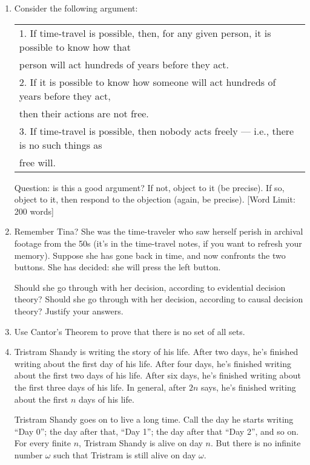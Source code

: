 \documentclass[12pt,a4paper]{article}
\begin{document}
\begin{enumerate}

\item Consider the following argument:
\begin{center}
\begin{tabular}{l}
1. If time-travel is possible, then, for any given person, it is possible to know how that\\ person will act hundreds of years before they act.\\
2. If it is possible to know how someone will act hundreds of years before they act, \\then their actions are not free.\\ \hline
3. If time-travel is possible, then nobody acts freely --- i.e., there is no such things as\\ free will.
\end{tabular}
\end{center}

Question: is this a good argument? If not, object to it (be precise). If so, object to it, then respond to the objection (again, be precise). [Word Limit: 200 words]

\item Remember Tina? She was the time-traveler who saw herself perish in archival footage from the 50s (it's in the time-travel notes, if you want to refresh your memory). Suppose she has gone back in time, and now confronts the two buttons. She has decided: she will press the left button.

Should she go through with her decision, according to evidential decision theory? Should she go through with her decision, according to causal decision theory? Justify your answers.

\item Use Cantor's Theorem to prove that there is no set of all sets.

\item Tristram Shandy is writing the story of his life. After two days, he's finished writing about the first day of his life. After four days, he's finished writing about the first two days of his life. After six days, he's finished writing about the first three days of his life. In general, after $2n$ says, he's finished writing about the first $n$ days of his life.

Tristram Shandy goes on to live a long time. Call the day he starts writing ``Day 0''; the day after that, ``Day 1''; the day after that ``Day 2'', and so on. For every finite $n$, Tristram Shandy is alive on day $n$. But there is no infinite number $\omega$ such that Tristram is still alive on day $\omega$.


\end{enumerate}
\end{document}
